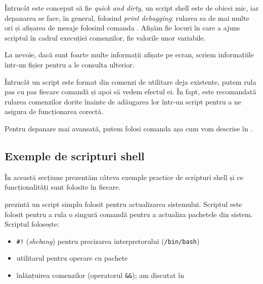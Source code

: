 Întrucât este conceput să fie \textit{quick and dirty}, un script shell este de obicei mic, iar depanarea se face, în general, folosind \textit{print debugging}: rularea sa de mai multe ori și afișarea de mesaje folosind comanda .
Afișăm fie locuri în care a ajuns scriptul în cadrul execuției comenzilor, fie valorile unor variabile.

La nevoie, dacă sunt foarte multe informații afișate pe ecran, scriem informațiile într-un fișier pentru a le consulta ulterior.

Întrucât un script este format din comenzi de utilitare deja existente, putem rula pas cu pas fiecare comandă și apoi să vedem efectul ei.
În fapt, este recomandată rularea comenzilor dorite înainte de adăugarea lor într-un script pentru a ne asigura de funcționarea corectă.

Pentru depanare mai avansată, putem folosi comanda  așa cum vom descrise în .

\subsection{Exemple de scripturi shell}
\label{sec:auto:dev:ex}

În această secțiune prezentăm câteva exemple practice de scripturi shell și ce funcționalități sunt folosite în fiecare.

 prezintă un script simplu folosit pentru actualizarea sistemului.
Scriptul este folosit pentru a rula o singură comandă pentru a actualiza pachetele din sistem.
Scriptul folosește:
\begin{itemize}
  \item \texttt{\#!} (\textit{shebang}) pentru precizarea interpretorului (\texttt{/bin/bash})
  \item utilitarul  pentru operare cu pachete
  \item înlănțuirea comenzilor (operatorul \texttt{\&\&}); am discutat în 
\end{itemize}


